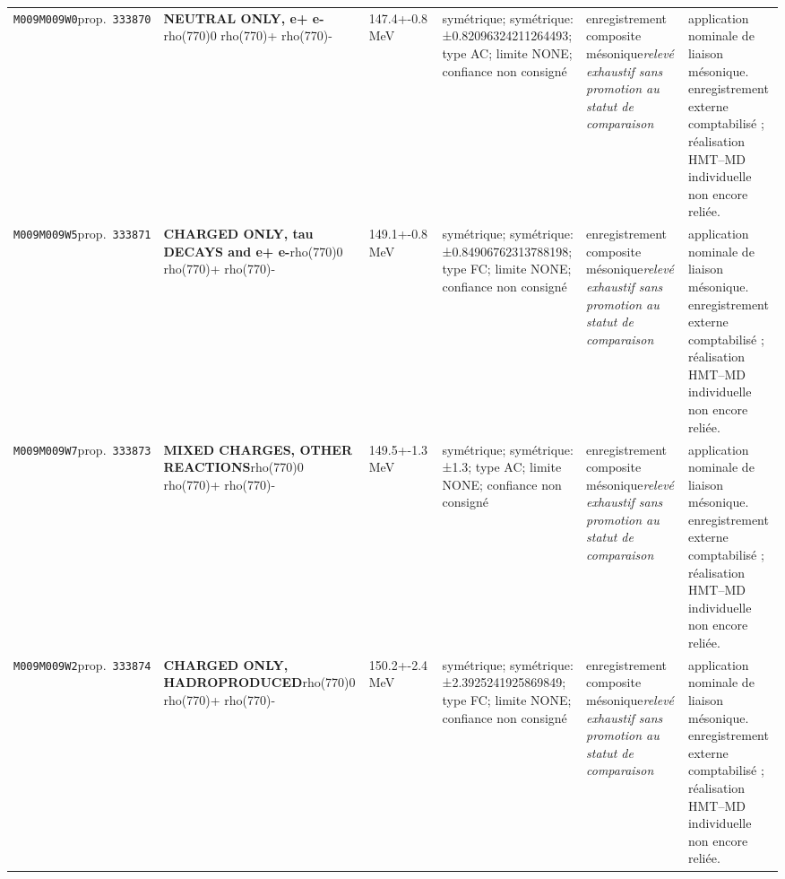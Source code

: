 \begin{landscape}
\begin{longtable}{L{1.85cm}L{4.45cm}L{2.35cm}L{4.05cm}L{3.35cm}L{7.15cm}}
\texttt{M009}\newline \texttt{M009W0}\newline prop.\ \texttt{333870} & \textbf{NEUTRAL ONLY, e+ e-}\newline rho(770)0 \textbar{}\allowbreak{} rho(770)+ \textbar{}\allowbreak{} rho(770)- & 147.4+-0.8\,MeV & symétrique; symétrique: ±0.82096324211264493; type AC; limite NONE; confiance non consigné & enregistrement composite mésonique\newline \emph{relevé exhaustif sans promotion au statut de comparaison} & application nominale de liaison mésonique. enregistrement externe comptabilisé ; réalisation HMT--MD individuelle non encore reliée. \\
\texttt{M009}\newline \texttt{M009W5}\newline prop.\ \texttt{333871} & \textbf{CHARGED ONLY, tau DECAYS and e+ e-}\newline rho(770)0 \textbar{}\allowbreak{} rho(770)+ \textbar{}\allowbreak{} rho(770)- & 149.1+-0.8\,MeV & symétrique; symétrique: ±0.84906762313788198; type FC; limite NONE; confiance non consigné & enregistrement composite mésonique\newline \emph{relevé exhaustif sans promotion au statut de comparaison} & application nominale de liaison mésonique. enregistrement externe comptabilisé ; réalisation HMT--MD individuelle non encore reliée. \\
\texttt{M009}\newline \texttt{M009W7}\newline prop.\ \texttt{333873} & \textbf{MIXED CHARGES, OTHER REACTIONS}\newline rho(770)0 \textbar{}\allowbreak{} rho(770)+ \textbar{}\allowbreak{} rho(770)- & 149.5+-1.3\,MeV & symétrique; symétrique: ±1.3; type AC; limite NONE; confiance non consigné & enregistrement composite mésonique\newline \emph{relevé exhaustif sans promotion au statut de comparaison} & application nominale de liaison mésonique. enregistrement externe comptabilisé ; réalisation HMT--MD individuelle non encore reliée. \\
\texttt{M009}\newline \texttt{M009W2}\newline prop.\ \texttt{333874} & \textbf{CHARGED ONLY, HADROPRODUCED}\newline rho(770)0 \textbar{}\allowbreak{} rho(770)+ \textbar{}\allowbreak{} rho(770)- & 150.2+-2.4\,MeV & symétrique; symétrique: ±2.3925241925869849; type FC; limite NONE; confiance non consigné & enregistrement composite mésonique\newline \emph{relevé exhaustif sans promotion au statut de comparaison} & application nominale de liaison mésonique. enregistrement externe comptabilisé ; réalisation HMT--MD individuelle non encore reliée. \\

\end{longtable}
\end{landscape}

